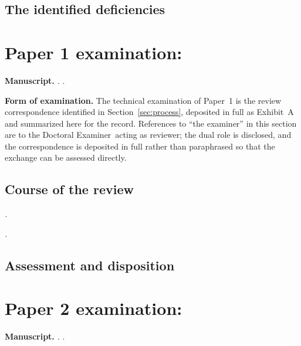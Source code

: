 \documentclass[11pt]{article}
\newcommand{\examinerRole}{Doctoral Examiner}
\newif\ifcorrespondence \correspondencetrue  %
\newif\ifdraftnotes     \draftnotesfalse     %
\newcommand{\paperheader}[4]{%
  \clearpage
  \section{Paper #1 examination: #2}\label{#4}
  \textbf{Manuscript.} \emph{#2.} #3.\par}
\newcommand{\note}[1]{\ifdraftnotes\textcolor{red}{\small[\,#1\,]}\fi}
\begin{document}
\subsection{The identified deficiencies}

\note{List the principal deficiencies, paper by paper, without softening them.
Then apply the governing standard of Section~\ref{sec:questions}: are they
evidence against doctoral competence, or the ordinary product of developing
original research? Show that the valid contributions survive removal or
reconstruction of the defective portions.}

\ifcorrespondence
\paperheader{1}{\note{Title of Paper 1}}{\note{Repository, DOI}}{sec:paper1}

\textbf{Form of examination.} The technical examination of Paper~1 is the
review correspondence identified in Section~\ref{sec:process}, deposited in
full as Exhibit~A and summarized here for the record. References to ``the
examiner'' in this section are to the \examinerRole\ acting as reviewer; the
dual role is disclosed, and the correspondence is deposited in full rather than
paraphrased so that the exchange can be assessed directly.

\subsection{Course of the review}

\note{Opening assessment and date.}

\emph{\note{First argument of the paper}.} \note{Objection raised; how it was
checked; what was adopted, rejected with reasons, or contributed by the
reviewer with attribution.}

\emph{\note{Second argument of the paper}.} \note{\dots}

\subsection{Assessment and disposition}

\note{What the correspondence shows about the review dynamic; how the
manuscript changed; whether any findings remain open; points recorded as
directions of continuing work rather than deficiencies.}
\fi

\paperheader{2}{\note{Title of Paper 2}}{\note{Repository, DOI}}{sec:paper2}
\end{document}

